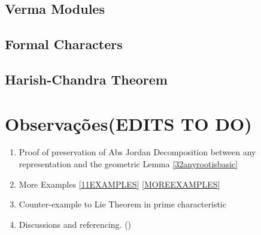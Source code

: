 \documentclass[svgnames,12pt,oneside, openright,a4paper]{scrbook}
\begin{document}
\section{Verma Modules}
\section{Formal Characters}
\section{Harish-Chandra Theorem}
\chapter{Observações(EDITS TO DO)}
\begin{enumerate}
	\item Proof of preservation of Abs Jordan Decomposition between any representation and the geometric Lemma \ref{32anyrootisbasic}
	\item More Examples \ref{11EXAMPLES} \ref{MOREEXAMPLES} 
	\item Counter-example to Lie Theorem in prime characteristic
	\item Discussions and referencing.
	(\cite{jacobson}\cite{humphreys2}\cite{sanmartin})
\end{enumerate}


\end{document}
